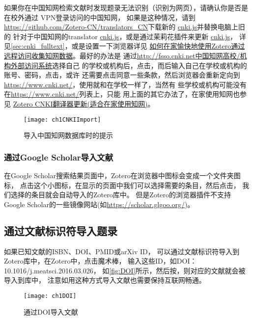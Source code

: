 \documentclass[cn,11pt,chinese]{elegantbook}
\begin{document}
	如果你在中国知网检索文献时发现题录无法识别（识别为网页），请确认你是否是在校外通过
	VPN登录访问的中国知网， 如果是这种情况，请到
	\url{https://github.com/Zotero-CN/translators_CN}下载新的
	\href{https://github.com/Zotero-CN/translators_CN}{cnki.js}并替换电脑上旧的
	针对于中国知网的translator \href{https://github.com/Zotero-CN/translators_CN}
	{cnki.js}，或是通过茉莉花插件来更新
	\href{https://github.com/Zotero-CN/translators_CN}{cnki.js}，
	详见\cref{sec:cnki_fulltext}，或是设置一下浏览器详见
	\href{https://zhuanlan.zhihu.com/p/110731827}{如何在家愉快地使用Zotero通过远程访问收集知网数据}。最好的办法是
	通过\href{ http://fsso.cnki.net}{http://fsso.cnki.net中国知网高校/机构外部访问系统}选择自己
	的学校或机构后，点击，而后输入自己在学校或机构的账号、密码，点击，或许
	还需要点击同意一些条款，然后浏览器会重新定向到
	\href{www.cnki.net}{https://www.cnki.net/}，使用就和在学校一样了，当然有
	些学校或机构可能没有在\href{www.cnki.net}{https://www.cnki.net/}列表上，只能
	用上面的其它办法了，在家使用知网也参见
	\href{https://zhuanlan.zhihu.com/p/351547307}{Zotero CNKI翻译器更新(适合在家使用知网)}。
	\begin{figure}[htbp]
		\centering
		\texttt{[image: ch1CNKIImport]}
		\caption{导入中国知网数据库时的提示}
		\label{fig:ch1CNKIImport}
	\end{figure}
	\subsubsection{通过Google Scholar导入文献}
	在Google Scholar搜索结果页面中，Zotero在浏览器中图标会变成一个文件夹图标，
	点击这个小图标，在显示的页面中我们可以选择需要的条目，然后点击，
	我们选择的条目就会自动导入的Zotero库中。
	但是Zotero的浏览器插件不支持Google Scholar的一些镜像网站(如\url{https://scholar.glgoo.org/})。
	\subsection{通过文献标识符导入题录}
	如果已知文献的ISBN、DOI、PMID或arXiv ID，
	可以通过文献标识符导入到Zotero库中，在Zotero中，点击魔术棒，
	输入这些ID，如DOI：10.1016/j.meatsci.2016.03.026，
	如\autoref{fig:DOI}所示，然后按，则对应的文献就会被导入到库中，
	注意如用这种方式导入文献也需要保持互联网畅通。
	\begin{figure}[htbp]
		\centering
		\texttt{[image: ch1DOI]}
		\caption{通过DOI导入文献}
		\label{fig:DOI}
	\end{figure}
\end{document}
